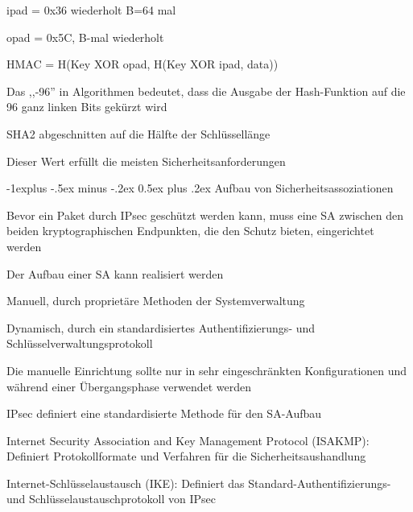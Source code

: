 \documentclass[a4paper]{article}
\makeatletter
\renewcommand{\subsection}{\@startsection{subsection}{2}{0mm}%
 {-1explus -.5ex minus -.2ex}%
 {0.5ex plus .2ex}%
 {\normalfont\normalsize\bfseries}}
\makeatother
\begin{document}
\begin{multicols}{3}
\begin{itemize*}
\begin{itemize*}
\begin{itemize*}
                        \item ipad = 0x36 wiederholt B=64 mal %
                        \item opad = 0x5C, B-mal wiederholt
                        \item HMAC = H(Key XOR opad, H(Key XOR ipad, data)) %
                  \end{itemize*}
                  \item Das ,,-96'' in Algorithmen bedeutet, dass die Ausgabe der Hash-Funktion auf die 96 ganz linken Bits gekürzt wird
                  \item SHA2 abgeschnitten auf die Hälfte der Schlüssellänge
                  \item Dieser Wert erfüllt die meisten Sicherheitsanforderungen
            \end{itemize*}
      \end{itemize*}

      \subsection{Aufbau von Sicherheitsassoziationen}
      \begin{itemize*}
            \item Bevor ein Paket durch IPsec geschützt werden kann, muss eine SA zwischen den beiden kryptographischen Endpunkten, die den Schutz bieten, eingerichtet werden
            \item Der Aufbau einer SA kann realisiert werden
            \begin{itemize*}
                  \item Manuell, durch proprietäre Methoden der Systemverwaltung
                  \item Dynamisch, durch ein standardisiertes Authentifizierungs- und Schlüsselverwaltungsprotokoll
                  \item Die manuelle Einrichtung sollte nur in sehr eingeschränkten Konfigurationen und während einer Übergangsphase verwendet werden
            \end{itemize*}
            \item IPsec definiert eine standardisierte Methode für den SA-Aufbau
            \begin{itemize*}
                  \item Internet Security Association and Key Management Protocol (ISAKMP): Definiert Protokollformate und Verfahren für die Sicherheitsaushandlung
                  \item Internet-Schlüsselaustausch (IKE): Definiert das Standard-Authentifizierungs- und Schlüsselaustauschprotokoll von IPsec
            \end{itemize*}
      \end{itemize*}


\end{multicols}
\end{document}
